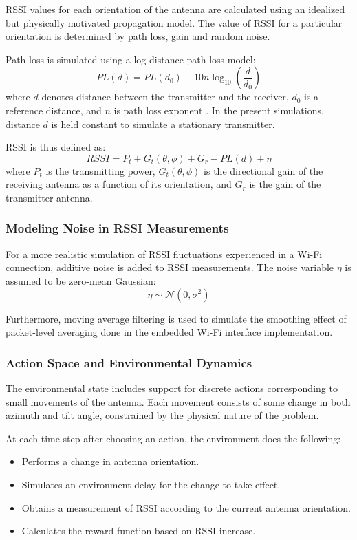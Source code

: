 RSSI values for each orientation of the antenna are calculated using an
idealized but physically motivated propagation model. The value of RSSI for
a particular orientation is determined by path loss, gain and random noise.

Path loss is simulated using a log-distance path loss model:
\begin{equation}
PL(d) = PL(d_0) + 10n \log_{10}\left(\frac{d}{d_0}\right)
\end{equation}
where $d$ denotes distance between the transmitter and the receiver, $d_0$ is a
reference distance, and $n$ is path loss exponent \cite{ref3}. In the present simulations,
distance $d$ is held constant to simulate a stationary transmitter.

RSSI is thus defined as:
\begin{equation}
RSSI = P_t + G_t(\theta, \phi) + G_r - PL(d) + \eta
\end{equation}
where $P_t$ is the transmitting power, $G_t(\theta, \phi)$ is the directional gain
of the receiving antenna as a function of its orientation, and $G_r$ is the gain
of the transmitter antenna.

\subsubsection{Modeling Noise in RSSI Measurements}

For a more realistic simulation of RSSI fluctuations experienced in a Wi-Fi
connection, additive noise is added to RSSI measurements. The noise variable
$\eta$ is assumed to be zero-mean Gaussian:
\begin{equation}
\eta \sim \mathcal{N}(0, \sigma^2)
\end{equation}

Furthermore, moving average filtering is used to simulate the smoothing effect of
packet-level averaging done in the embedded Wi-Fi interface implementation.

\subsubsection{Action Space and Environmental Dynamics}

The environmental state includes support for discrete actions corresponding to small
movements of the antenna. Each movement consists of some change in both azimuth and
tilt angle, constrained by the physical nature of the problem.

At each time step after choosing an action, the environment does the following:
\begin{itemize}
    \item Performs a change in antenna orientation.
    \item Simulates an environment delay for the change to take effect.
    \item Obtains a measurement of RSSI according to the current antenna orientation.
    \item Calculates the reward function based on RSSI increase.
\end{itemize}

